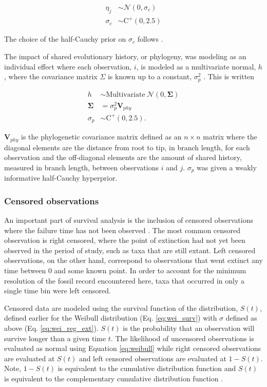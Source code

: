 \documentclass{article}
\begin{document}
\begin{align*}
  \eta_{j} &\sim \mathcal{N}(0, \sigma_{c}) \\
  \sigma_{c} &\sim \mathrm{C}^{+}(0, 2.5)
\end{align*}

The choice of the half-Cauchy prior on \(\sigma_{c}\) follows \cite{Gelman2006a}.

The impact of shared evolutionary history, or phylogeny, was modeling as an individual effect where each observation, \(i\), is modeled as a multivariate normal, \(h\), where the covariance matrix \(\Sigma\) is known up to a constant, \(\sigma_{p}^{2}\) \cite{Lynch1991,Housworth2004}. This is written

\begin{align*}
  h &\sim \mathrm{Multivariate\ }\mathcal{N}(0, \mathbf{\Sigma}) \\
  \mathbf{\Sigma} &= \sigma_{p}^{2} \mathbf{V}_{phy} \\
  \sigma_{p} &\sim \mathrm{C}^{+}(0, 2.5).
\end{align*}

\(\mathbf{V}_{phy}\) is the phylogenetic covariance matrix defined as an \(n \times n\) matrix where the diagonal elements are the distance from root to tip, in branch length, for each observation and the off-diagonal elements are the amount of shared history, measured in branch length, between observations \(i\) and \(j\). \(\sigma_{p}\) was given a weakly informative half-Cauchy hyperprior. 


\subsubsection{Censored observations} \label{sec:censor}

An important part of survival analysis is the inclusion of censored observations where the failure time has not been observed \cite{Ibrahim2001,Klein2003}. The most common censored observation is right censored, where the point of extinction had not yet been observed in the period of study, such as taxa that are still extant. Left censored observations, on the other hand, correspond to observations that went extinct any time between 0 and some known point. In order to account for the minimum resolution of the fossil record encountered here, taxa that occurred in only a single time bin were left censored.

Censored data are modeled using the survival function of the distribution, \(S(t)\), defined earlier for the Weibull distribution (Eq. \ref{eq:wei_surv}) with \(\sigma\) defined as above (Eq. \ref{eq:wei_reg_ext}). \(S(t)\) is the probability that an observation will survive longer than a given time \(t\). The likelihood of uncensored observations is evaluated as normal using Equation \ref{eq:weibull} while right censored observations are evaluated at \(S(t)\) and left censored observations are evaluated at \(1 - S(t)\). Note, \(1 - S(t)\) is equivalent to the cumulative distribution function and \(S(t)\) is equivalent to the complementary cumulative distribution function \cite{Gelman2013d}.
\end{document}
